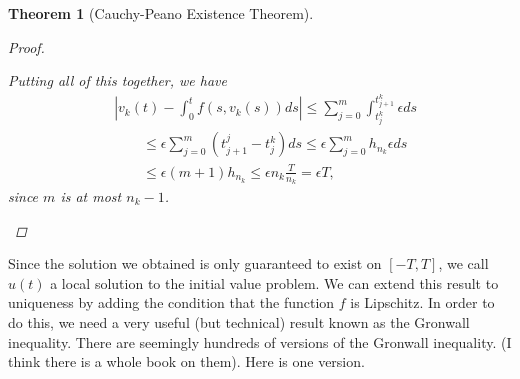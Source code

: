 \documentclass[12pt]{amsart}         %
\newtheorem{theorem}{Theorem}[section]
\theoremstyle{remark}
\begin{document}
\begin{theorem}[Cauchy-Peano Existence Theorem]
\begin{proof}
\begin{enumerate}
\[    \]
    Putting all of this together, we have
    \begin{align*}
    &\left| v_k(t) - \int_0^t f(s, v_k(s))ds \right|
    \leq \sum_{j=0}^{m} \int_{t_j^k}^{t_{j+1}^k} \epsilon ds \\
    &\qquad \leq \epsilon \sum_{j=0}^m (t_{j+1}^j - t_j^k) ds
    \leq \epsilon \sum_{j=0}^m h_{n_k} \epsilon ds \\
    &\qquad \leq \epsilon (m+1) h_{n_k}
    \leq \epsilon n_k \frac{T}{n_k}
    = \epsilon T,
    \end{align*}
    since $m$ is at most $n_k - 1$.
\end{enumerate}
\end{proof}
\end{theorem}

Since the solution we obtained is only guaranteed to exist on $[-T, T]$, we call $u(t)$ a local solution to the initial value problem. We can extend this result to uniqueness by adding the condition that the function $f$ is Lipschitz. In order to do this, we need a very useful (but technical) result known as the Gronwall inequality. There are seemingly hundreds of versions of the Gronwall inequality. (I think there is a whole book on them). Here is one version.
\end{document}
